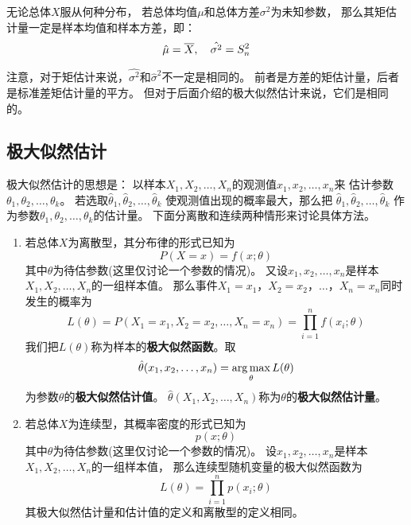 \begin{theorem}
  无论总体$X$服从何种分布，
  若总体均值$\mu$和总体方差$\sigma^2$为未知参数，
  那么其矩估计量一定是样本均值和样本方差，即：
  \begin{displaymath}
    \hat{\mu}=\overline{X},\quad \hat{\sigma^2}=S_n^2
  \end{displaymath}
\end{theorem}

\begin{remark}
  注意，对于矩估计来说，$\hat{\sigma^2}$和$\hat{\sigma}^2$不一定是相同的。
  前者是方差的矩估计量，后者是标准差矩估计量的平方。
  但对于后面介绍的极大似然估计来说，它们是相同的。
\end{remark}

\subsection{极大似然估计}
极大似然估计的思想是：
以样本$X_1,X_2,\dots,X_n$的观测值$x_1,x_2,\dots,x_n$来
估计参数$\theta_1,\theta_2,\dots,\theta_k$。
若选取$\hat{\theta}_1,\hat{\theta}_2,\dots,\hat{\theta}_k$
使观测值出现的概率最大，那么把
$\hat{\theta}_1,\hat{\theta}_2,\dots,\hat{\theta}_k$
作为参数$\theta_1,\theta_2,\dots,\theta_k$的估计量。
下面分离散和连续两种情形来讨论具体方法。

\begin{enumerate}
  \item
  若总体$X$为离散型，其分布律的形式已知为
  \begin{displaymath}
    P(X=x) = f(x; \theta)
  \end{displaymath}
  其中$\theta$为待估参数(这里仅讨论一个参数的情况)。
  又设$x_1,x_2,\dots,x_n$是样本$X_1,X_2,\dots,X_n$的一组样本值。
  那么事件$X_1=x_1$，$X_2=x_2$，$\dots$，$X_n=x_n$同时发生的概率为
  \begin{displaymath}
    L(\theta) = P(X_1=x_1,X_2=x_2,\dots,X_n=x_n)
    = \prod_{i=1}^n f(x_i;\theta)
  \end{displaymath}
  我们把$L(\theta)$称为样本的\textbf{极大似然函数}。取
  \begin{displaymath}
    \hat{\theta}(x_1,x_2,\dots,x_n)= \operatorname*{arg\,max}_\theta L(\theta)
  \end{displaymath}
  为参数$\theta$的\textbf{极大似然估计值}。
  $\hat{\theta}(X_1,X_2,\dots,X_n)$称为$\theta$的\textbf{极大似然估计量}。
  \item
  若总体$X$为连续型，其概率密度的形式已知为
  \begin{displaymath}
    p(x;\theta)
  \end{displaymath}
  其中$\theta$为待估参数(这里仅讨论一个参数的情况)。
  设$x_1,x_2,\dots,x_n$是样本$X_1,X_2,\dots,X_n$的一组样本值，
  那么连续型随机变量的极大似然函数为
  \begin{displaymath}
    L(\theta) = \prod_{i=1}^n p(x_i;\theta)
  \end{displaymath}
  其极大似然估计量和估计值的定义和离散型的定义相同。
\end{enumerate}

